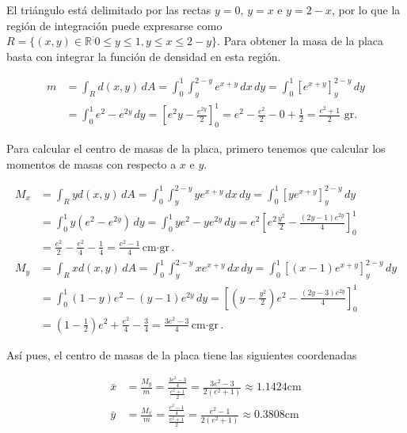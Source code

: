 \documentclass[
  spanish,
  a4paper,
]{scrreport}
\theoremstyle{definition}
\theoremstyle{remark}
\begin{document}
\begin{tcolorbox}[enhanced jigsaw, arc=.35mm, bottomrule=.15mm, bottomtitle=1mm, breakable, colback=white, colbacktitle=quarto-callout-tip-color!10!white, colframe=quarto-callout-tip-color-frame, coltitle=black, left=2mm, leftrule=.75mm, opacityback=0, opacitybacktitle=0.6, rightrule=.15mm, title=\textcolor{quarto-callout-tip-color}{\faLightbulb}\hspace{0.5em}{Solución}, titlerule=0mm, toprule=.15mm, toptitle=1mm]

El triángulo está delimitado por las rectas \(y=0\), \(y=x\) e
\(y=2-x\), por lo que la región de integración puede expresarse como
\(R=\{(x,y)\in\mathbb{R}^: 0\leq y\leq 1, y\leq x\leq 2-y\}\). Para
obtener la masa de la placa basta con integrar la función de densidad en
esta región.

\begin{align*}
m
&= \int_R d(x,y)\,dA
= \int_0^1 \int_y^{2-y} e^{x+y}\,dx\,dy
= \int_0^1 [e^{x+y}]_y^{2-y} \,dy \\
&= \int_0^1 e^2 - e^{2y} \,dy 
= \left[e^2 y- \frac{e^{2y}}{2}\right]_0^1
= e^2 - \frac{e^2}{2} - 0 + \frac{1}{2}
= \frac{e^2+1}{2} \mbox{ gr}.
\end{align*}

Para calcular el centro de masas de la placa, primero tenemos que
calcular los momentos de masas con respecto a \(x\) e \(y\).

\begin{align*}
M_x
&= \int_R yd(x,y)\,dA
= \int_0^1 \int_y^{2-y} ye^{x+y}\,dx\,dy
= \int_0^1 [ye^{x+y}]_y^{2-y} \,dy \\
&= \int_0^1 y(e^2 - e^{2y}) \,dy
= \int_0^1 ye^2-ye^{2y}\,dy 
= e^2\left[e^2\frac{y^2}{2}-\frac{(2y-1)e^{2y}}{4} \right]_0^1 \\
&= \frac{e^2}{2} - \frac{e^2}{4} - \frac{1}{4}
= \frac{e^2-1}{4}\mbox{cm$\cdot$gr}. \\
M_y
&= \int_R xd(x,y)\,dA
= \int_0^1 \int_y^{2-y} xe^{x+y}\,dx\,dy
= \int_0^1 [(x-1)e^{x+y}]_y^{2-y} \,dy \\
&= \int_0^1 (1-y)e^2-(y-1)e^{2y} \,dy
= \left[\left(y-\frac{y^2}{2}\right)e^2 - \frac{(2y-3)e^{2y}}{4}\right]_0^1 \\
&= \left(1-\frac{1}{2}\right)e^2 + \frac{e^2}{4} - \frac{3}{4}
= \frac{3e^2-3}{4}\mbox{cm$\cdot$gr}.
\end{align*}

Así pues, el centro de masas de la placa tiene las siguientes
coordenadas

\begin{align*}
\bar x 
&= \frac{M_y}{m} 
= \frac{\frac{3e^2-3}{4}}{\frac{e^2+1}{2}}
= \frac{3e^2-3}{2(e^2+1)} 
\approx 1.1424 \mbox{cm}\\
\bar y
&= \frac{M_x}{m} 
= \frac{\frac{e^2-1}{4}}{\frac{e^2+1}{2}}
= \frac{e^2-1}{2(e^2+1)} 
\approx 0.3808 \mbox{cm}
\end{align*}

\end{tcolorbox}
\end{document}
